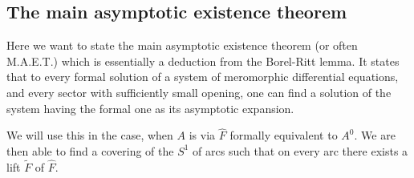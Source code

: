 \subsection{The main asymptotic existence theorem}
\TODO[move] 
\begin{comment}
  \begin{multicols}{2}
    \textbf{Classical:}
    \begin{itemize}
      \item \cite[Thm.4.4.1]{Loday2014}
      \item \cite[Thm.7.10]{van2003galois}{\tiny\cite[Thm.7.12]{van2003galois}}
      \item \cite[Thm.12.1]{wasow2002asymptotic}
      \item \cite[5.3.Thm.1]{Varadarajan96linearmeromorphic}
      \item \cite[207]{Balser2000Formal}: Some historical remarks
    \end{itemize}
  \columnbreak
    \textbf{Sheafical:}
    \begin{itemize}
      \item \cite[Thm.2.3.1]{sabbah_cimpa90}
    \end{itemize}
  \end{multicols}
\end{comment}
Here we want to state the main asymptotic existence theorem (or often M.A.E.T.)
which is essentially a deduction from the Borel-Ritt lemma.
It states that to every formal solution of a system of meromorphic differential
equations, and every sector with sufficiently small opening, one can find a
solution of the system having the formal one as its asymptotic expansion.
\begin{rem}
  We will use this in the case, when $A$ is via $\hat F$ formally equivalent to
  $A^0$. We are then able to find a  covering of the $S^1$ of
  arcs such that on every arc there exists a lift $\tilde F$ of $\hat F$.
\end{rem}
\TODO{}
